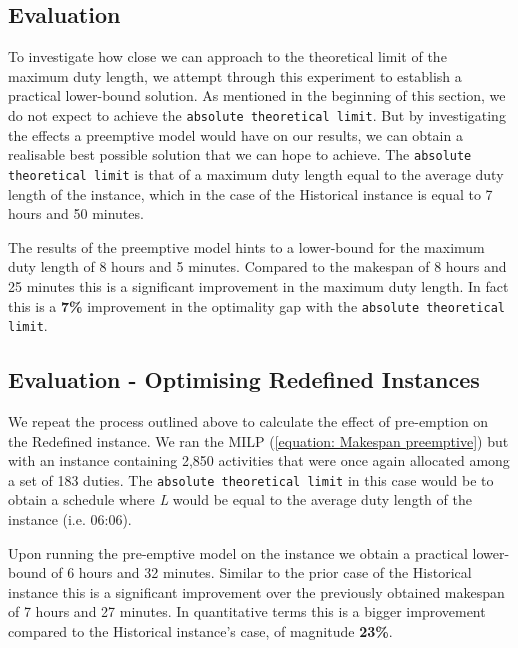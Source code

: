 
\subsection*{Evaluation}
To investigate how close we can approach to the theoretical limit of the maximum duty length, we attempt through this experiment to establish a practical lower-bound solution. As mentioned in the beginning of this section, we do not expect to achieve the \texttt{absolute theoretical limit}. But by investigating the effects a preemptive model would have on our results, we can obtain a realisable best possible solution that we can hope to achieve. The \texttt{absolute theoretical limit} is that of a maximum duty length equal to the average duty length of the instance, which in the case of the Historical instance is equal to 7 hours and 50 minutes.

\vspace{\baselineskip}
\noindent
The results of the preemptive model hints to a lower-bound for the maximum duty length of 8 hours and 5 minutes. Compared to the makespan of 8 hours and 25 minutes this is a significant improvement in the maximum duty length. In fact this is a \textbf{7\%} improvement in the optimality gap with the \texttt{absolute theoretical limit}. 


\subsection*{Evaluation - Optimising Redefined Instances}
We repeat the process outlined above to calculate the effect of pre-emption on the Redefined instance. We ran the MILP (\ref{equation: Makespan preemptive}) but with an instance containing 2,850 activities that were once again allocated among a set of 183 duties. The \texttt{absolute theoretical limit} in this case would be to obtain a schedule where \textit{L} would be equal to the average duty length of the instance (i.e. 06:06). 

\vspace{\baselineskip}
\noindent
Upon running the pre-emptive model on the instance we obtain a practical lower-bound of 6 hours and 32 minutes. Similar to the prior case of the Historical instance this is a significant improvement over the previously obtained makespan of 7 hours and 27 minutes. In quantitative terms this is a bigger improvement compared to the Historical instance's case, of magnitude \textbf{23\%}.